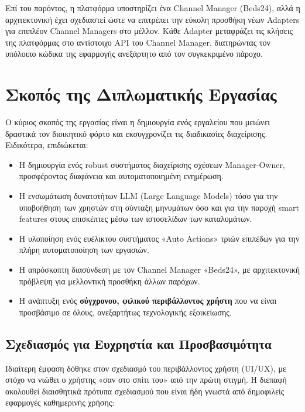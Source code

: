 \documentclass[
	12pt, %
	oneside, %
	greek,
	onehalfspacing, %
	liststotoc, %
	toctotoc, %
	parskip, %
	headsepline, %
]{MastersDoctoralThesis} %
\begin{document}
Επί του παρόντος, η πλατφόρμα υποστηρίζει ένα Channel Manager (Beds24), αλλά η αρχιτεκτονική έχει σχεδιαστεί ώστε να επιτρέπει την εύκολη προσθήκη νέων Adapters για επιπλέον Channel Managers στο μέλλον. Κάθε Adapter μεταφράζει τις κλήσεις της πλατφόρμας στο αντίστοιχο API του Channel Manager, διατηρώντας τον υπόλοιπο κώδικα της εφαρμογής ανεξάρτητο από τον συγκεκριμένο πάροχο.

\section{Σκοπός της Διπλωματικής Εργασίας}
\label{sec:purpose}

Ο κύριος σκοπός της εργασίας είναι η δημιουργία ενός εργαλείου που μειώνει δραστικά τον διοικητικό φόρτο και εκσυγχρονίζει τις διαδικασίες διαχείρισης. Ειδικότερα, επιδιώκεται:

\begin{itemize}
    \item Η δημιουργία ενός robust συστήματος διαχείρισης σχέσεων Manager-Owner, προσφέροντας διαφάνεια και αυτοματοποιημένη ενημέρωση.
    \item Η ενσωμάτωση δυνατοτήτων LLM (Large Language Models) τόσο για την υποβοήθηση των χρηστών στη σύνταξη μηνυμάτων όσο και για την παροχή smart features στους επισκέπτες μέσω των ιστοσελίδων των καταλυμάτων.
    \item Η υλοποίηση ενός ευέλικτου συστήματος «Auto Actions» τριών επιπέδων για την πλήρη αυτοματοποίηση των εργασιών.
    \item Η απρόσκοπτη διασύνδεση με τον Channel Manager «Beds24», με αρχιτεκτονική πρόβλεψη για μελλοντική προσθήκη άλλων παρόχων.
    \item Η ανάπτυξη ενός \textbf{σύγχρονου, φιλικού περιβάλλοντος χρήστη} που να είναι προσβάσιμο σε όλους, ανεξαρτήτως τεχνολογικής εξοικείωσης.
\end{itemize}

\subsection{Σχεδιασμός για Ευχρηστία και Προσβασιμότητα}
\label{subsec:ui-design}

Ιδιαίτερη έμφαση δόθηκε στον σχεδιασμό του περιβάλλοντος χρήστη (UI/UX), με στόχο να νιώθει ο χρήστης «σαν στο σπίτι του» από την πρώτη στιγμή. Η διεπαφή ακολουθεί διαισθητικά πρότυπα σχεδιασμού που είναι ήδη γνωστά από δημοφιλείς εφαρμογές καθημερινής χρήσης:
\end{document}
